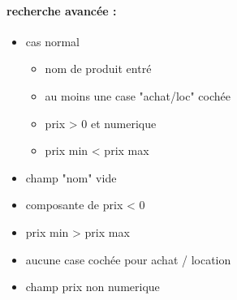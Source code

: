 \paragraph{recherche avancée :}
\begin{itemize}
	\item cas normal 
		\begin{itemize}
			\item nom de produit entré
			\item au moins une case "achat/loc" cochée
			\item prix > 0 et numerique
			\item prix min < prix max 
		\end{itemize} 
	\item champ "nom" vide
	\item composante de prix < 0
	\item prix min > prix max
	\item aucune case cochée pour achat / location
	\item champ prix non numerique
\end{itemize}
